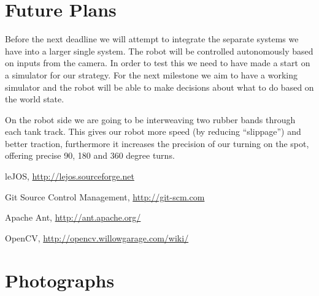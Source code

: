 \documentclass[12pt, a4paper, titlepage]{article}
\begin{document}
\section{Future Plans}

Before the next deadline we will attempt to integrate the separate systems we
have into a larger single system. The robot will be controlled autonomously
based on inputs from the camera. In order to test this we need to have made a
start on a simulator for our strategy. For the next milestone we aim to have a
working simulator and the robot will be able to make decisions about what to do
based on the world state.

On the robot side we are going to be interweaving two rubber bands through each
tank track. This gives our robot more speed (by reducing “slippage”) and
better traction, furthermore it increases the precision of our turning on the
spot, offering precise 90, 180 and 360 degree turns.

\newpage

\setcounter{section}{5}
\begin{thebibliography}{9}

	leJOS,
	\url{http://lejos.sourceforge.net}

	Git Source Control Management,
	\url{http://git-scm.com}

	Apache Ant,
	\url{http://ant.apache.org/}

	OpenCV,
	\url{http://opencv.willowgarage.com/wiki/}

\end{thebibliography}

\appendix
\section{Photographs}
\end{document}

